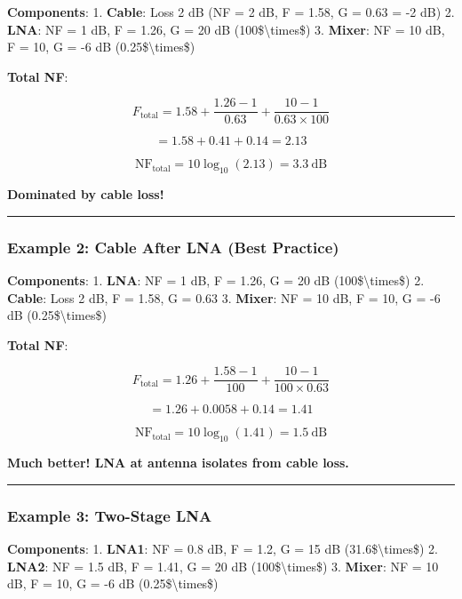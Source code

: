 \textbf{Components}: 1. \textbf{Cable}: Loss 2 dB (NF = 2 dB, F = 1.58,
G = 0.63 = -2 dB) 2. \textbf{LNA}: NF = 1 dB, F = 1.26, G = 20 dB
(100\$\textbackslash times\$) 3. \textbf{Mixer}: NF = 10 dB, F = 10, G =
-6 dB (0.25\$\textbackslash times\$)

\textbf{Total NF}:

\[
F_{\text{total}} = 1.58 + \frac{1.26 - 1}{0.63} + \frac{10 - 1}{0.63 \times 100}
\]

\[
= 1.58 + 0.41 + 0.14 = 2.13
\]

\[
\text{NF}_{\text{total}} = 10\log_{10}(2.13) = 3.3\ \text{dB}
\]

\textbf{Dominated by cable loss!}

\begin{center}\rule{0.5\linewidth}{0.5pt}\end{center}

\subsubsection{Example 2: Cable After LNA (Best
Practice)}\label{example-2-cable-after-lna-best-practice}

\textbf{Components}: 1. \textbf{LNA}: NF = 1 dB, F = 1.26, G = 20 dB
(100\$\textbackslash times\$) 2. \textbf{Cable}: Loss 2 dB, F = 1.58, G
= 0.63 3. \textbf{Mixer}: NF = 10 dB, F = 10, G = -6 dB
(0.25\$\textbackslash times\$)

\textbf{Total NF}:

\[
F_{\text{total}} = 1.26 + \frac{1.58 - 1}{100} + \frac{10 - 1}{100 \times 0.63}
\]

\[
= 1.26 + 0.0058 + 0.14 = 1.41
\]

\[
\text{NF}_{\text{total}} = 10\log_{10}(1.41) = 1.5\ \text{dB}
\]

\textbf{Much better! LNA at antenna isolates from cable loss.}

\begin{center}\rule{0.5\linewidth}{0.5pt}\end{center}

\subsubsection{Example 3: Two-Stage LNA}\label{example-3-two-stage-lna}

\textbf{Components}: 1. \textbf{LNA1}: NF = 0.8 dB, F = 1.2, G = 15 dB
(31.6\$\textbackslash times\$) 2. \textbf{LNA2}: NF = 1.5 dB, F = 1.41,
G = 20 dB (100\$\textbackslash times\$) 3. \textbf{Mixer}: NF = 10 dB, F
= 10, G = -6 dB (0.25\$\textbackslash times\$)

